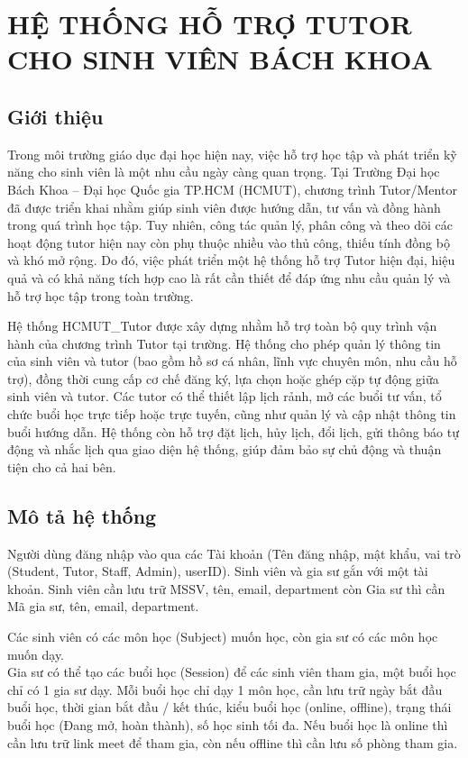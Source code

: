 \chapter{HỆ THỐNG HỖ TRỢ TUTOR CHO SINH VIÊN BÁCH KHOA}

\section{Giới thiệu}
Trong môi trường giáo dục đại học hiện nay, việc hỗ trợ học tập và phát triển kỹ năng cho
sinh viên là một nhu cầu ngày càng quan trọng. Tại Trường Đại học Bách Khoa – Đại học
Quốc gia TP.HCM (HCMUT), chương trình Tutor/Mentor đã được triển khai nhằm giúp sinh
viên được hướng dẫn, tư vấn và đồng hành trong quá trình học tập. Tuy nhiên, công tác quản
lý, phân công và theo dõi các hoạt động tutor hiện nay còn phụ thuộc nhiều vào thủ công, thiếu
tính đồng bộ và khó mở rộng. Do đó, việc phát triển một hệ thống hỗ trợ Tutor hiện đại, hiệu
quả và có khả năng tích hợp cao là rất cần thiết để đáp ứng nhu cầu quản lý và hỗ trợ học tập
trong toàn trường.

Hệ thống HCMUT\_Tutor được xây dựng nhằm hỗ trợ toàn bộ quy trình vận hành của
chương trình Tutor tại trường. Hệ thống cho phép quản lý thông tin của sinh viên và tutor
(bao gồm hồ sơ cá nhân, lĩnh vực chuyên môn, nhu cầu hỗ trợ), đồng thời cung cấp cơ chế
đăng ký, lựa chọn hoặc ghép cặp tự động giữa sinh viên và tutor. Các tutor có thể thiết lập
lịch rảnh, mở các buổi tư vấn, tổ chức buổi học trực tiếp hoặc trực tuyến, cũng như quản lý và
cập nhật thông tin buổi hướng dẫn. Hệ thống còn hỗ trợ đặt lịch, hủy lịch, đổi lịch, gửi thông
báo tự động và nhắc lịch qua giao diện hệ thống, giúp đảm bảo sự chủ động và thuận
tiện cho cả hai bên.

\section{Mô tả hệ thống}
Người dùng đăng nhập vào qua các Tài khoản (Tên đăng nhập, mật khẩu, vai trò (Student, Tutor, Staff, Admin), userID). Sinh viên và gia sư gắn với một tài khoản. Sinh viên cần lưu trữ MSSV, tên, email, department còn Gia sư thì cần Mã gia sư, tên, email, department.


Các sinh viên có các môn học (Subject) muốn học, còn gia sư có các môn học muốn dạy.\\


Gia sư có thể tạo các buổi học (Session) để các sinh viên tham gia, một buổi học chỉ có 1 gia sư dạy. Mỗi buổi học chỉ dạy 1 môn học, cần lưu trữ ngày bắt đầu buổi học, thời gian bắt đầu / kết thúc, kiểu buổi học (online, offline), trạng thái buổi học (Đang mở, hoàn thành), số học sinh tối đa. Nếu buổi học là online thì cần lưu trữ link meet để tham gia, còn nếu offline thì cần lưu số phòng tham gia. 


